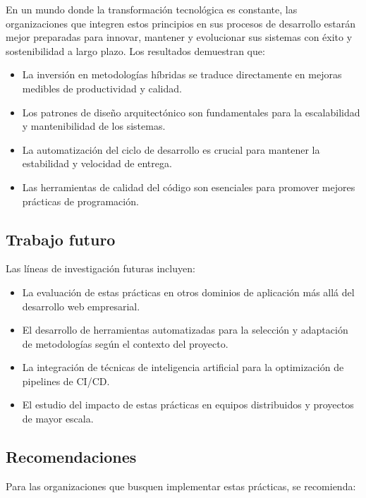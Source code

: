 En un mundo donde la transformación tecnológica es constante, las organizaciones que integren estos principios en sus procesos de desarrollo estarán mejor preparadas para innovar, mantener y evolucionar sus sistemas con éxito y sostenibilidad a largo plazo. Los resultados demuestran que:

\begin{itemize}
    \item La inversión en metodologías híbridas se traduce directamente en mejoras medibles de productividad y calidad.
    \item Los patrones de diseño arquitectónico son fundamentales para la escalabilidad y mantenibilidad de los sistemas.
    \item La automatización del ciclo de desarrollo es crucial para mantener la estabilidad y velocidad de entrega.
    \item Las herramientas de calidad del código son esenciales para promover mejores prácticas de programación.
\end{itemize}

\subsection{Trabajo futuro}

Las líneas de investigación futuras incluyen:

\begin{itemize}
    \item La evaluación de estas prácticas en otros dominios de aplicación más allá del desarrollo web empresarial.
    \item El desarrollo de herramientas automatizadas para la selección y adaptación de metodologías según el contexto del proyecto.
    \item La integración de técnicas de inteligencia artificial para la optimización de pipelines de CI/CD.
    \item El estudio del impacto de estas prácticas en equipos distribuidos y proyectos de mayor escala.
\end{itemize}

\subsection{Recomendaciones}

Para las organizaciones que busquen implementar estas prácticas, se recomienda:

